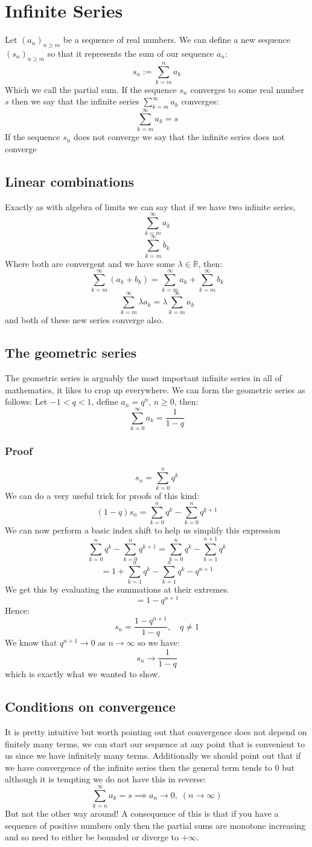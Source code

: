 \documentclass[12pt]{article}
\begin{document}
\section{Infinite Series}
Let \((a_n)_{n\geq m}\) be a sequence of real numbers. We can define a new sequence \((s_n)_{n\geq m}\) so that it represents the sum of our sequence \(a_n\):
\[s_n:=\sum_{k=m}^n a_k\]
Which we call the partial sum. If the sequence \(s_n\) converges to some real number \(s\) then we say that the infinite series \(\sum^\infty_{k=m}a_k\) converges:
\[\sum^\infty_{k=m}a_k=s\]
If the sequence \(s_n\) does not converge we say that the infinite series does not converge
\subsection*{Linear combinations}
Exactly as with algebra of limits we can say that if we have two infinite series,
\[\sum^\infty_{k=m}a_k\]
\[\sum^\infty_{k=m}b_k\]
Where both are convergent and we have some \(\lambda\in\mathbb{R}\), then:
\[\sum^\infty_{k=m}(a_k+b_k)=\sum^\infty_{k=m}a_k+\sum^\infty_{k=m}b_k\]
\[\sum^\infty_{k=m}\lambda a_k=\lambda\sum^\infty_{k=m}a_k\]
and both of these new series converge also.
\subsection*{The geometric series}
The geometric series is arguably the most important infinite series in all of mathematics, it likes to crop up everywhere. We can form the geometric series as follows: Let \(-1<q<1\), define \(a_n=q^n,\, n\geq 0\), then:
\[\sum_{k=0}^\infty a_k=\frac{1}{1-q}\]
\subsubsection*{Proof}
\[s_n=\sum_{k=0}^nq^k\]
We can do a very useful trick for proofs of this kind:
\[(1-q)s_n=\sum_{k=0}^n q^k-\sum_{k=0}^n q^{k+1}\]
We can now perform a basic index shift to help us simplify this expression
\[\sum_{k=0}^n q^k-\sum_{k=0}^n q^{k+1}=\sum_{k=0}^n q^k-\sum_{k=1}^{n+1} q^{k}\]
\[=1+\sum_{k=1}^n q^k - \sum^n_{k=1} q^k-q^{n+1}\]
We get this by evaluating the summations at their extremes.
\[=1-q^{n+1}\]
Hence:
\[s_n=\frac{1-q^{n+1}}{1-q},\quad q\ne 1\]
We know that \(q^{n+1}\to 0\) as \(n\to\infty\) so we have:
\[s_n\to \frac{1}{1-q}\]
which is exactly what we wanted to show.
\subsection*{Conditions on convergence}
It is pretty intuitive but worth pointing out that convergence does not depend on finitely many terms, we can start our sequence at any point that is convenient to us since we have infinitely many terms. Additionally we should point out that if we have convergence of the infinite series then the general term tends to 0 but although it is tempting we do not have this in reverse:
\[\sum_{k=n}^\infty a_k=s\implies a_n\to 0,\; (n\to\infty)\]
But not the other way around! A consequence of this is that if you have a sequence of positive numbers only then the partial sums are monotone increasing and so need to either be bounded or diverge to \(+\infty\).
\end{document}

